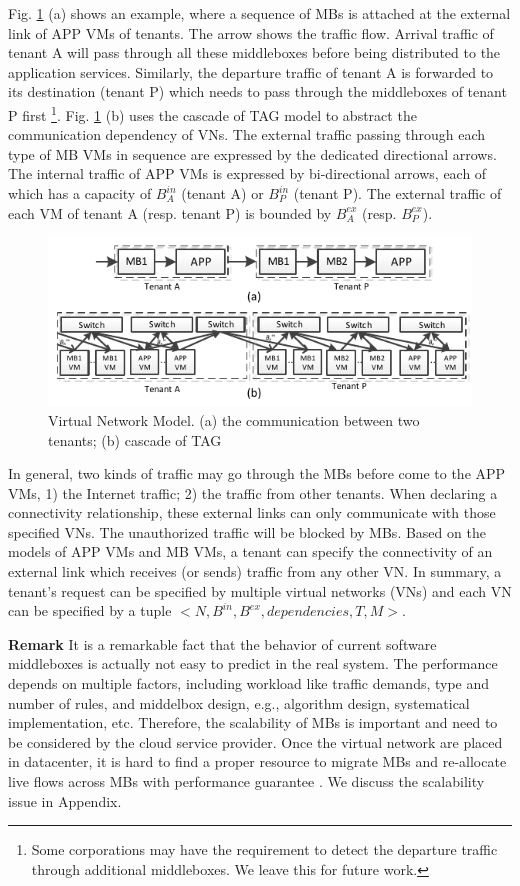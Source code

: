 \documentclass[10pt, conference, letterpaper]{IEEEtran}
\begin{document}
Fig. \ref{fig:abstraction} (a) shows an example, where a sequence of MBs is attached at the external link of APP VMs of tenants. The arrow shows the traffic flow. Arrival traffic of tenant A will pass through all these middleboxes before being distributed to the application services. Similarly,  the departure traffic of tenant A is forwarded to its destination (tenant P) which needs to pass through the middleboxes of tenant P first \footnote{Some corporations may have the requirement to detect the departure traffic through additional middleboxes. We leave this for future work. }.  Fig. \ref{fig:abstraction} (b) uses the cascade of TAG model to abstract the communication dependency of VNs. The external traffic passing through each type of MB VMs in sequence are expressed by the dedicated directional arrows. The internal traffic of APP VMs is expressed by bi-directional arrows, each of which has a capacity of $B_{A}^{in}$ (tenant A) or $B_{P}^{in}$ (tenant P). The external traffic of each VM of tenant A (resp. tenant P) is bounded by $B_{A}^{ex}$ (resp. $B_{P}^{ex}$). 
\begin{figure}
	\centering
		\includegraphics[width=3.5 in]{fig/abstraction.pdf}
	\caption{Virtual Network Model. (a) the communication between two tenants; (b) cascade of TAG}
	\label{fig:abstraction}
\end{figure}

In general, two kinds of traffic may go through the MBs before come to the APP VMs, 1) the Internet traffic; 2) the traffic from other tenants. When declaring a connectivity relationship, these external links can only communicate with those specified VNs. The unauthorized traffic will be blocked by MBs. Based on the models of APP VMs and MB VMs, a tenant can specify the connectivity of an external link which receives (or sends) traffic from any other VN. In summary, a tenant's request can be specified by multiple virtual networks (VNs) and each VN can be specified by a tuple $<N, B^{in}, B^{ex}, dependencies, T, M>$. 

\noindent \textbf{Remark } 
It is a remarkable fact that the behavior of current software middleboxes is actually not easy to predict in the real system. The performance depends on multiple factors, including workload like traffic demands, type and number of rules, and middelbox design, e.g., algorithm design, systematical implementation, etc. Therefore, the scalability of MBs is important and need to be considered by the cloud service provider. Once the virtual network are placed in datacenter, it is hard to find a proper resource to migrate MBs and re-allocate live flows across MBs with performance guarantee \cite{G13dio}. We discuss the scalability issue in Appendix.
\end{document}
